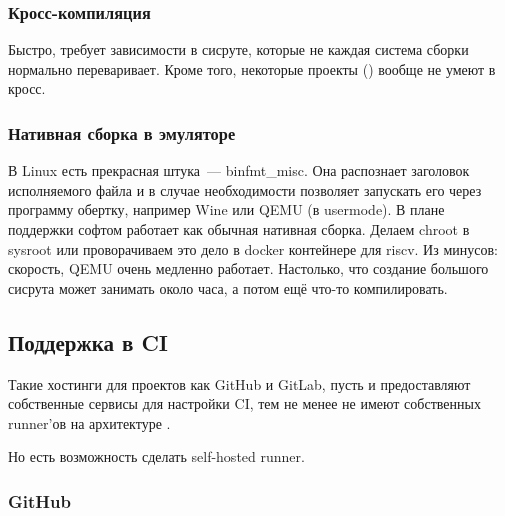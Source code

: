 \subsubsection{Кросс-компиляция}


Быстро, требует зависимости в сисруте, которые не каждая система сборки нормально переваривает.
Кроме того, некоторые проекты (\OCaml) вообще не умеют в кросс.

\subsubsection{Нативная сборка в эмуляторе}

В Linux есть прекрасная штука~--- binfmt\_misc.
Она распознает заголовок исполняемого файла и в случае необходимости позволяет запускать его через программу обертку, например Wine или QEMU (в usermode). 
В плане поддержки софтом работает как обычная нативная сборка.
Делаем chroot в sysroot или проворачиваем это дело в docker контейнере для riscv.
Из минусов: скорость, QEMU очень медленно работает.
Настолько, что создание большого сисрута может занимать около часа, а потом ещё что-то компилировать.

\subsection{Поддержка в CI}

Такие хостинги для проектов как GitHub и GitLab, пусть и предоставляют собственные сервисы для настройки CI, тем не менее не имеют собственных runner'ов на архитектуре \riscv{}.


Но есть возможность сделать self-hosted runner.

\subsubsection{GitHub}

